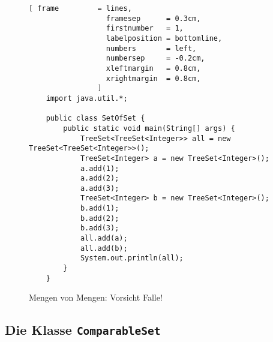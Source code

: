 \begin{figure}[!ht]
\centering
\begin{Verbatim}[ frame         = lines, 
                  framesep      = 0.3cm, 
                  firstnumber   = 1,
                  labelposition = bottomline,
                  numbers       = left,
                  numbersep     = -0.2cm,
                  xleftmargin   = 0.8cm,
                  xrightmargin  = 0.8cm,
                ]
    import java.util.*;
    
    public class SetOfSet {
        public static void main(String[] args) {
            TreeSet<TreeSet<Integer>> all = new TreeSet<TreeSet<Integer>>();
            TreeSet<Integer> a = new TreeSet<Integer>();
            a.add(1);
            a.add(2);
            a.add(3);
            TreeSet<Integer> b = new TreeSet<Integer>();
            b.add(1);
            b.add(2);
            b.add(3);
            all.add(a);
            all.add(b);
            System.out.println(all);
        }
    }
\end{Verbatim}
\vspace*{-0.3cm}
\caption{Mengen von Mengen: Vorsicht Falle!}
\label{fig:SetOfSet.java}
\end{figure}



\subsection{Die Klasse \texttt{ComparableSet}}

